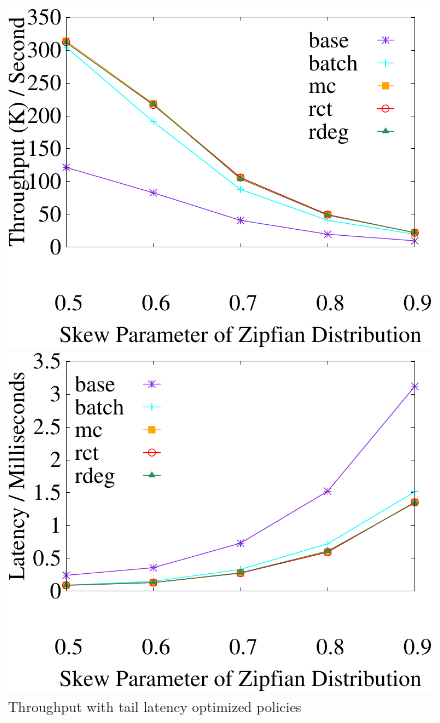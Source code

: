 \begin{figure}[t]
	\centering
	\begin{minipage}[b]{0.31\linewidth}
	\centering
	\includegraphics[width=\textwidth]{./exp_fig/restart/tps}
	\caption{Throughput with tail latency optimized policies}
	\label{fig:restart:tps}
	\end{minipage}
	\begin{minipage}[b]{0.31\linewidth}
		\centering
		\includegraphics[width=\textwidth]{./exp_fig/restart/latency}

\end{minipage}
\end{figure}
